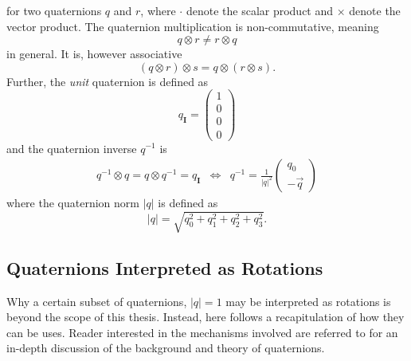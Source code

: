\documentclass{LTHthesis}
\begin{document}
%
for two quaternions $q$ and $r$, where $\cdot$ denote the scalar product and $\times$ denote the vector product. The quaternion multiplication is non-commutative, meaning
%
\begin{equation}
{q}\otimes {r} \neq {r} \otimes {q}
\end{equation}
%
in general. It is, however associative
%
\begin{equation}
({q}\otimes{r})\otimes{s} = {q}\otimes({r}\otimes{s}).
\label{equation:quat_asso}
\end{equation} 
%
Further, the \emph{unit} quaternion is defined as
%
\begin{equation}
{q_{\mathbf{I}}}=\left(\begin{array}{c}1\\ 0 \\ 0 \\ 0\end{array}\right)
\end{equation}
%
and the quaternion inverse $q^{-1}$ is
%
\begin{eqnarray}
q^{-1}\otimes q = q\otimes q^{-1} = q_{\mathbf{I}} &\Leftrightarrow& q^{-1} = \frac{1}{|q|^2}\left(\begin{array}{c}q_0\\ -\vec{q}\end{array}\right)
\end{eqnarray}
%
where the quaternion norm $|q|$ is defined as
%
\begin{equation}
|q| = \sqrt{q_0^2+q_1^2+q_2^2+q_3^2 }.
\end{equation} 
%
\subsection{Quaternions Interpreted as Rotations}
%
Why a certain subset of quaternions, $|q|=1$ may be interpreted as rotations is beyond the scope of this thesis. Instead, here follows a recapitulation of how they can be uses. Reader interested in the mechanisms involved are referred to \cite{kuip98} for an in-depth discussion of the background and theory of quaternions. 
\end{document}
